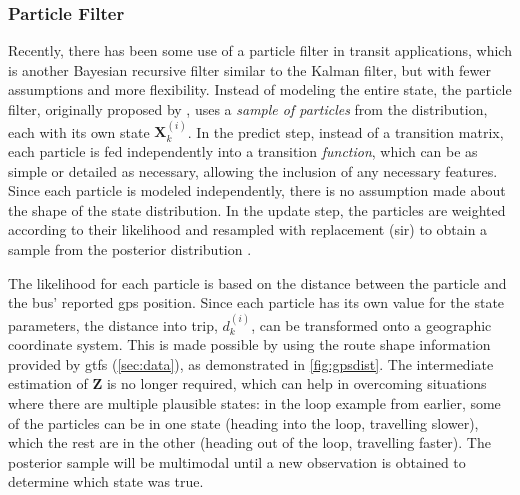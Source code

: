 \documentclass[12pt,a4paper]{article}
\newcommand{\bX}{\mathbf{X}}
\newcommand{\mat}[1]{\mathbf{#1}}
\newcommand{\kf}{Kalman filter}
\newcommand{\pf}{particle filter}
\begin{document}
\subsubsection{Particle Filter}
\label{sec:particle-filter}

Recently, there has been some use of a \pf{} in transit applications,
which is another Bayesian recursive filter similar to the \kf{},
but with fewer assumptions and more flexibility.
Instead of modeling the entire state,
the \pf{}, originally proposed by \cite{gordon-etal:1993},
uses a \emph{sample of particles} from the distribution,
each with its own state $\bX_k^{(i)}$.
In the predict step, instead of a transition matrix,
each particle is fed independently into a transition \emph{function},
which can be as simple or detailed as necessary,
allowing the inclusion of any necessary features.
Since each particle is modeled independently,
there is no assumption made about the shape of the state distribution.
In the update step, the particles are weighted according to their likelihood
and resampled with replacement (\gls{sir}) to obtain a
sample from the posterior distribution \citep{gordon-etal:1993}.


The likelihood for each particle is based on the distance between the particle
and the bus' reported \gls{gps} position.
Since each particle has its own value for the state parameters,
the distance into trip, $d_k^{(i)}$, can be transformed onto a geographic coordinate system.
This is made possible by using the route shape information provided by \gls{gtfs} (\cref{sec:data}),
as demonstrated in \cref{fig:gpsdist}.
The intermediate estimation of $\mat{Z}$ is no longer required,
which can help in overcoming situations where there are multiple plausible states:
in the loop example from earlier, some of the particles can be in one state
(heading into the loop, travelling slower), 
which the rest are in the other (heading out of the loop, travelling faster).
The posterior sample will be multimodal until a new observation is obtained to 
determine which state was true.
\end{document}
